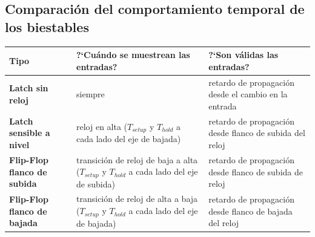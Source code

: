 \subsection{Comparación del comportamiento temporal de los biestables}

\begin{table}[H]
	\centering
	\begin{tabularx}{\textwidth}{|X|X|X|}
		\hline
		\textbf{Tipo}                       & \textbf{?`Cuándo se muestrean las entradas?}                                                 & \textbf{?`Son válidas las entradas?}                    \\
		\hline
		\textbf{Latch sin reloj}            & siempre                                                                                      & retardo de propagación desde el cambio en la entrada    \\
		\hline
		\textbf{Latch sensible a nivel}     & reloj en alta ($T_{setup}$ y $T_{hold}$ a cada lado del eje de bajada)                       & retardo de propagación desde flanco de subida del reloj \\
		\hline
		\textbf{Flip-Flop flanco de subida} & transición de reloj de baja a alta  ($T_{setup}$ y $T_{hold}$ a cada lado del eje de subida) & retardo de propagación desde flanco de subida de reloj  \\
		\hline
		\textbf{Flip-Flop flanco de bajada} & transición de reloj de alta a baja ($T_{setup}$ y $T_{hold}$ a cada lado del eje de bajada)  & retardo de propagación desde flanco de bajada del reloj \\
		\hline
	\end{tabularx}
\end{table}

